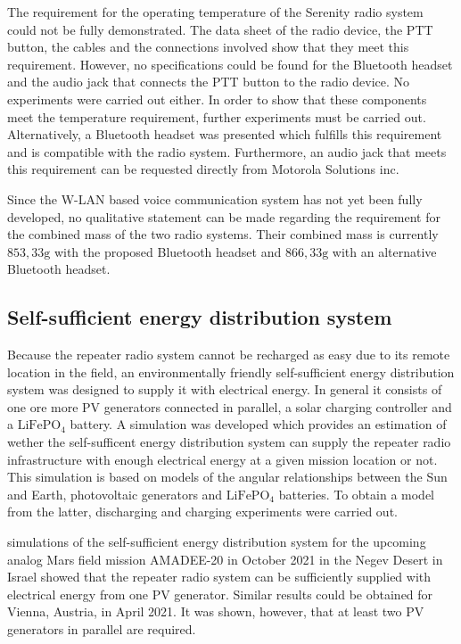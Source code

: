 The requirement for the operating temperature of the Serenity radio system could not be fully demonstrated. The data sheet of the radio device, the PTT button, the cables and the connections involved show that they meet this requirement. However, no specifications could be found for the Bluetooth headset and the audio jack that connects the PTT button to the radio device. No experiments were carried out either. In order to show that these components meet the temperature requirement, further experiments must be carried out. Alternatively, a Bluetooth headset was presented which fulfills this requirement and is compatible with the radio system. Furthermore, an audio jack that meets this requirement can be requested directly from Motorola Solutions inc. 

Since the W-LAN based voice communication system has not yet been fully developed, no qualitative statement can be made regarding the requirement for the combined mass of the two radio systems. Their combined mass is currently $853,33\mathrm{g}$ with the proposed Bluetooth headset and $866,33\mathrm{g}$ with an alternative Bluetooth headset.  

\subsection{Self-sufficient energy distribution system}
Because the repeater radio system cannot be recharged as easy due to its remote location in the field, an environmentally friendly self-sufficient energy distribution system was designed to supply it with electrical energy. In general it consists of one ore more PV generators connected in parallel, a solar charging controller and a $\mathrm{LiFePO}_4$ battery. A \MATLAB simulation was developed which provides an estimation of wether the self-sufficent energy distribution system can supply the repeater radio infrastructure with enough electrical energy at a given mission location or not. This simulation is based on models of the angular relationships between the Sun and Earth, photovoltaic generators and $\mathrm{LiFePO}_4$ batteries. To obtain a model from the latter, discharging and charging experiments were carried out.

\MATLAB simulations of the self-sufficient energy distribution system for the upcoming analog Mars field mission AMADEE-20 in October 2021 in the Negev Desert in Israel showed that the repeater radio system can be sufficiently supplied with electrical energy from one PV generator. Similar results could be obtained for Vienna, Austria, in April 2021. It was shown, however, that at least two PV generators in parallel are required.

